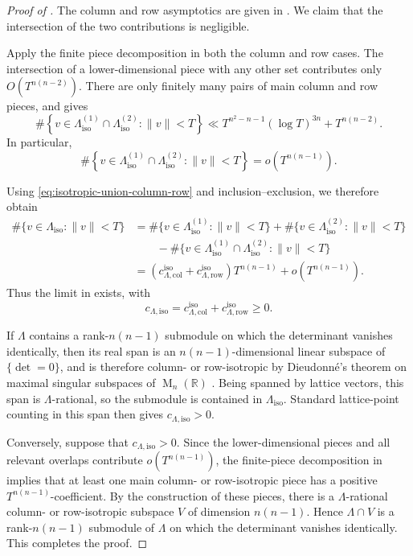 \documentclass[reqno,11pt]{amsart}
\numberwithin{equation}{section}
\theoremstyle{definition}
\theoremstyle{remark}
\newcommand{\op}{\operatorname}
\newcommand{\br}{\mathbb R}
\newcommand{\M}{\op{M}}
\begin{document}
\begin{proof}[Proof of ]
The column and row asymptotics are given in
. We claim that the intersection of the two contributions is
negligible.

Apply the finite piece decomposition in both the column and row cases. The
intersection of a lower-dimensional piece with any other set contributes
only $O(T^{n(n-2)})$. There are only finitely many pairs of main column
and row pieces, and  gives
$$
\#\left\{
v\in\Lambda_{\operatorname{iso}}^{(1)}\cap\Lambda_{\operatorname{iso}}^{(2)}:
\|v\|< T
\right\}
\ll
T^{n^2-n-1}(\log T)^{3n}
+
T^{n(n-2)}.
$$
In particular,
\begin{equation}\label{eq:column-row-overlap-negligible}
\#\left\{
v\in\Lambda_{\operatorname{iso}}^{(1)}\cap\Lambda_{\operatorname{iso}}^{(2)}:
\|v\|< T
\right\}
=
o(T^{n(n-1)}).
\end{equation}

Using \eqref{eq:isotropic-union-column-row} and inclusion--exclusion, we
therefore obtain
$$
\begin{aligned}
\#\{v\in\Lambda_{\operatorname{iso}}:\|v\|< T\}
&=
\#\{v\in\Lambda_{\operatorname{iso}}^{(1)}:\|v\|< T\}
+
\#\{v\in\Lambda_{\operatorname{iso}}^{(2)}:\|v\|< T\}\\
&\qquad-
\#\{v\in\Lambda_{\operatorname{iso}}^{(1)}\cap\Lambda_{\operatorname{iso}}^{(2)}:
\|v\|< T\}\\
&=
\left(
 c_{\Lambda,\mathrm{col}}^{\mathrm{iso}}
 +c_{\Lambda,\mathrm{row}}^{\mathrm{iso}}
\right)T^{n(n-1)}
+o(T^{n(n-1)}).
\end{aligned}
$$
Thus the limit in  exists, with
$$
c_{\Lambda,\mathrm{iso}}
=
c_{\Lambda,\mathrm{col}}^{\mathrm{iso}}
+c_{\Lambda,\mathrm{row}}^{\mathrm{iso}}
\ge0.
$$

If $\Lambda$ contains a
rank-$n(n-1)$ submodule on which the determinant vanishes identically,
then its real span is an $n(n-1)$-dimensional linear subspace of
$\{\det=0\}$, and is therefore column- or row-isotropic by Dieudonn\'e's
theorem on maximal singular subspaces of $\M_n (\br)$ \cite{dieudonne:1948}.
Being spanned by lattice vectors, this span is $\Lambda$-rational, so the
submodule is contained in $\Lambda_{\operatorname{iso}}$. Standard
lattice-point counting in this span then gives
$c_{\Lambda,\mathrm{iso}}>0$. 

Conversely, suppose that $c_{\Lambda,\mathrm{iso}}>0$. Since the
lower-dimensional pieces and all relevant overlaps contribute
$o(T^{n(n-1)})$, the finite-piece decomposition in
 implies that at least one
main column- or row-isotropic piece has a positive $T^{n(n-1)}$-coefficient. By the construction of
these pieces, there is a $\Lambda$-rational column- or row-isotropic
subspace $V$ of dimension $n(n-1)$. Hence
$\Lambda\cap V$ is a rank-$n(n-1)$ submodule of $\Lambda$ on
which the determinant vanishes identically. This completes the proof.
\end{proof}
\end{document}

